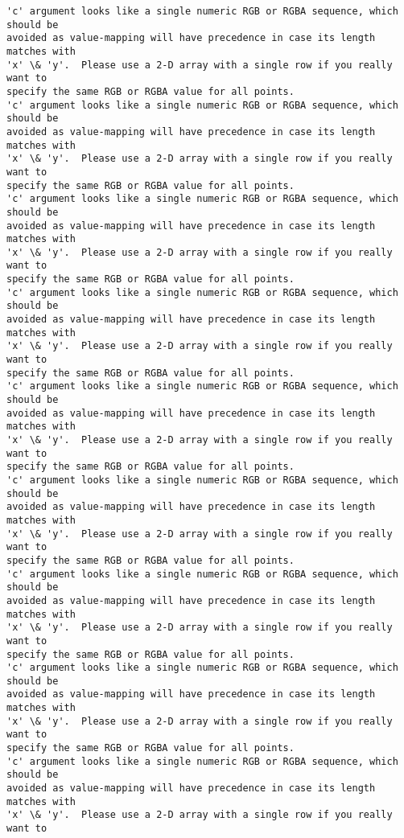 \documentclass[11pt]{article}
\begin{document}
    \begin{Verbatim}[commandchars=\\\{\}]
'c' argument looks like a single numeric RGB or RGBA sequence, which should be
avoided as value-mapping will have precedence in case its length matches with
'x' \& 'y'.  Please use a 2-D array with a single row if you really want to
specify the same RGB or RGBA value for all points.
'c' argument looks like a single numeric RGB or RGBA sequence, which should be
avoided as value-mapping will have precedence in case its length matches with
'x' \& 'y'.  Please use a 2-D array with a single row if you really want to
specify the same RGB or RGBA value for all points.
'c' argument looks like a single numeric RGB or RGBA sequence, which should be
avoided as value-mapping will have precedence in case its length matches with
'x' \& 'y'.  Please use a 2-D array with a single row if you really want to
specify the same RGB or RGBA value for all points.
'c' argument looks like a single numeric RGB or RGBA sequence, which should be
avoided as value-mapping will have precedence in case its length matches with
'x' \& 'y'.  Please use a 2-D array with a single row if you really want to
specify the same RGB or RGBA value for all points.
'c' argument looks like a single numeric RGB or RGBA sequence, which should be
avoided as value-mapping will have precedence in case its length matches with
'x' \& 'y'.  Please use a 2-D array with a single row if you really want to
specify the same RGB or RGBA value for all points.
'c' argument looks like a single numeric RGB or RGBA sequence, which should be
avoided as value-mapping will have precedence in case its length matches with
'x' \& 'y'.  Please use a 2-D array with a single row if you really want to
specify the same RGB or RGBA value for all points.
'c' argument looks like a single numeric RGB or RGBA sequence, which should be
avoided as value-mapping will have precedence in case its length matches with
'x' \& 'y'.  Please use a 2-D array with a single row if you really want to
specify the same RGB or RGBA value for all points.
'c' argument looks like a single numeric RGB or RGBA sequence, which should be
avoided as value-mapping will have precedence in case its length matches with
'x' \& 'y'.  Please use a 2-D array with a single row if you really want to
specify the same RGB or RGBA value for all points.
'c' argument looks like a single numeric RGB or RGBA sequence, which should be
avoided as value-mapping will have precedence in case its length matches with
'x' \& 'y'.  Please use a 2-D array with a single row if you really want to

\end{Verbatim}
\end{document}
